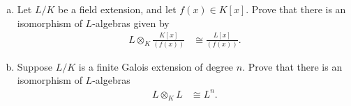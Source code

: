 \documentclass[10pt]{mypackage}
\begin{document}
\begin{problem}[Problem 7]\hfill
  \begin{enumerate}[(a)]
    \item Let $L/K$ be a field extension, and let $f(x)\in K[x]$. Prove that there is an isomorphism of $L$-algebras given by
      \begin{align*}
        L\otimes_{K} \frac{K[x]}{\left( f(x) \right)} &\cong \frac{L[x]}{\left( f(x) \right)}.
      \end{align*}
    \item Suppose $L/K$ is a finite Galois extension of degree $n$. Prove that there is an isomorphism of $L$-algebras
      \begin{align*}
        L\otimes_{K}L &\cong L^{n}.
      \end{align*}
  \end{enumerate}
\end{problem}
\end{document}
